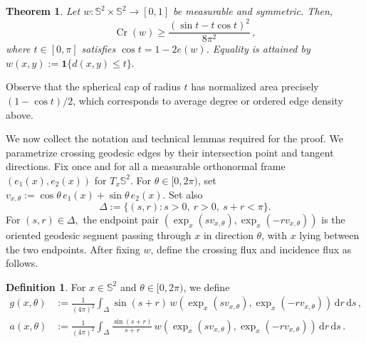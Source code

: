 \documentclass[reqno, 11pt]{amsart}
\newtheorem{theorem}{Theorem}
\theoremstyle{definition}
\newtheorem{definition}{Definition}
\newcommand{\dd}{\mathrm{d}}
\newcommand{\II}[1]{\mathbf{1}{#1}}
\begin{document}
\begin{theorem}\label{thm:continuous-spherical-crossing-main}
Let \(w:{\mathbb S}^2\times{\mathbb S}^2\to[0,1]\) be measurable and symmetric. Then,
\begin{equation}\label{eq:continuous-spherical-bound-main}
        \operatorname{Cr}(w)\ge
        \frac{(\sin t-t\cos t)^2}{8\pi^2}\,,
\end{equation}
where \(t\in[0,\pi]\) satisfies $\cos t = 1-2e(w)$. Equality is attained by \( w(x,y):=\II{\{d(x,y)\le t\}}.\) 
\end{theorem}

Observe that the spherical cap of radius $t$ has normalized area precisely $(1-\cos t)/2$, which corresponds to average degree or ordered edge density  above.

\medskip 


We now collect the notation and technical lemmas required for the proof. We parametrize crossing geodesic edges by their intersection point and tangent directions.  Fix once and for all a measurable orthonormal frame \((e_1(x),e_2(x))\) for \(T_x{\mathbb S}^2\).  For \(\theta\in[0,2\pi)\), set $v_{x,\theta}:=\cos\theta\,e_1(x)+\sin\theta\,e_2(x).$ Set also
\begin{equation}\label{eq:triangle-domain-main}
        \Delta:=\{(s,r):s>0,\ r>0,\ s+r<\pi\}.
\end{equation}
For $(s,r)\in\Delta,$ the endpoint pair $ \left(\exp_x(sv_{x,\theta}),\exp_x(-rv_{x,\theta})\right)$ is the oriented geodesic segment passing through \(x\) in direction \(\theta\), with \(x\) lying between the two endpoints. After fixing \(w\), define the crossing flux and incidence flux as follows.
\begin{definition}\label{def:normalized-spherical-fluxes}
For \(x\in{\mathbb S}^2\) and \(\theta\in[0,2\pi)\), we define
\begin{align}
        g(x,\theta)&:=
        \frac1{(4\pi)^2}
        \int_{\Delta}
        \sin(s+r)\,
        w\left(\exp_x(sv_{x,\theta}),\exp_x(-rv_{x,\theta})\right)
        \,\dd r\,\dd s \,, \label{eq:normalized-g-def}\\
        a(x,\theta)&:=
        \frac1{(4\pi)^2}
        \int_{\Delta}
        \frac{\sin(s+r)}{s+r}\,
        w\left(\exp_x(sv_{x,\theta}),\exp_x(-rv_{x,\theta})\right)
        \,\dd r\,\dd s\,.\label{eq:normalized-a-def}
\end{align}
\end{definition}
\end{document}
